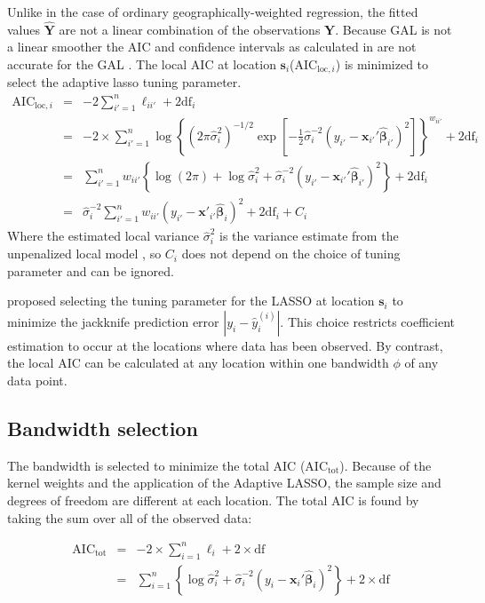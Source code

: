 \documentclass[authoryear, review, 11pt]{elsarticle}
\begin{document}
	Unlike in the case of ordinary geographically-weighted regression, the fitted values $\hat{\bm{Y}}$ are not a linear combination of the observations $\bm{Y}$. Because GAL is not a linear smoother the AIC and confidence intervals as calculated in \cite{Fotheringham:2002} are not accurate for the GAL \citep{Zou:2006}. The local AIC at location $\bm{s}_i$($\mbox{AIC}_{\text{loc}, i}$) is minimized to select the adaptive lasso tuning parameter.
	\begin{eqnarray}
		\mbox{AIC}_{\text{loc}, i} &=& -2 \sum_{i'=1}^n \ell_{ii'}  + 2 \mbox{df}_i\\
		&=& -2 \times \sum_{i'=1}^n \log \left\{ \left(2 \pi \hat{\sigma}_i^2\right)^{-1/2} \exp \left[-\frac{1}{2} \hat{\sigma}_i^{-2} \left(y_{i'} - \bm{x}_{i'}' \hat{\bm{\beta}}_{i'} \right)^2\right] \right\}^{w_{ii'}} + 2\mbox{df}_i\\
		&=& \sum_{i'=1}^n w_{ii'} \left\{ \log \left(2 \pi \right) + \log \hat{\sigma}_i^2 + \hat{\sigma}_i^{-2} \left(y_{i'} - \bm{x}_{i'}' \hat{\bm{\beta}}_{i'} \right)^2 \right\} + 2\mbox{df}_i \\
		&=& \hat{\sigma}_i^{-2} \sum_{i'=1}^n w_{ii'} \left( y_{i'} - \bm{x}'_{i'} \hat{\bm{\beta}}_i \right)^2 + 2 \mbox{df}_i + C_i
	\end{eqnarray}	
	Where the estimated local variance $\hat{\sigma}_i^2$ is the variance estimate from the unpenalized local model \citep{Zou:2007}, so $C_i$ does not depend on the choice of tuning parameter and can be ignored.
	
	\cite{Wheeler:2009} proposed selecting the tuning parameter for the LASSO at location $\bm{s}_i$ to minimize the jackknife prediction error $|y_i - \hat{y}_i^{(i)}|$. This choice restricts coefficient estimation to occur at the locations where data has been observed. By contrast, the local AIC can be calculated at any location within one bandwidth $\phi$ of any data point. 
	 
	\subsection{Bandwidth selection}
	The bandwidth is selected to minimize the total AIC ($\mbox{AIC}_{\mbox{tot}}$). Because of the kernel weights and the application of the Adaptive LASSO, the sample size and degrees of freedom are different at each location. The total AIC is found by taking the sum over all of the observed data:	
		
	\begin{eqnarray}
		\mbox{AIC}_{\mbox{tot}} &=& -2 \times \sum_{i=1}^n \ell_i + 2 \times \mbox{df}\\
		&=& \sum_{i=1}^n \left\{ \log \hat{\sigma}_i^2 + \hat{\sigma}_i^{-2} \left(y_i - \bm{x}_i' \hat{\bm{\beta}}_i \right)^2 \right\} + 2 \times \mbox{df}\label{eq:total-AIC1}
	\end{eqnarray}	
	
\end{document}
